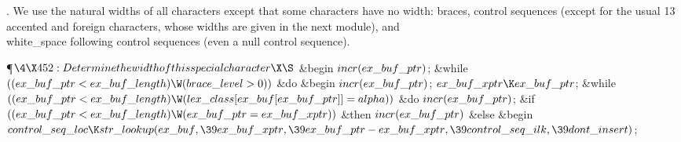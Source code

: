 .
We use the natural widths of all characters except that some
characters have no width: braces, control sequences (except for the
usual 13 accented and foreign characters, whose widths are given in
the next module), and \\{white\_space} following control sequences (even
a null control sequence).

\Y\P$\4\X452:Determine the width of this special character\X\S$\6
\&{begin} $\\{incr}(\\{ex\_buf\_ptr})$;\6
\&{while} $((\\{ex\_buf\_ptr}<\\{ex\_buf\_length})\W(\\{brace\_level}>0))$ \1%
\&{do}\6
\&{begin} $\\{incr}(\\{ex\_buf\_ptr})$;\6
$\\{ex\_buf\_xptr}\K\\{ex\_buf\_ptr}$;\6
\&{while} $((\\{ex\_buf\_ptr}<\\{ex\_buf\_length})\W(\\{lex\_class}[\\{ex%
\_buf}[\\{ex\_buf\_ptr}]]=\\{alpha}))$ \1\&{do}\6
$\\{incr}(\\{ex\_buf\_ptr})$;\2\6
\&{if} $((\\{ex\_buf\_ptr}<\\{ex\_buf\_length})\W(\\{ex\_buf\_ptr}=\\{ex\_buf%
\_xptr}))$ \1\&{then}\5
$\\{incr}(\\{ex\_buf\_ptr})$\6
\4\&{else} \&{begin} $\\{control\_seq\_loc}\K\\{str\_lookup}(\\{ex\_buf},\39%
\\{ex\_buf\_xptr},\39\\{ex\_buf\_ptr}-\\{ex\_buf\_xptr},\39\\{control\_seq%
\_ilk},\39\\{dont\_insert})$;\6
